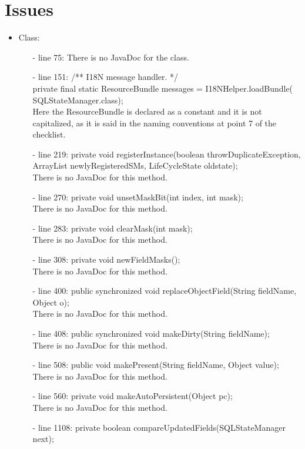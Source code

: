 \documentclass[18pt,oneside,a4paper, titlepage]{article}
\begin{document}
\newpage
\section{Issues}
	\begin{itemize}
		\item Class:
			\begin{itemize}
				\item[-] line 75: There is no JavaDoc for the class.
				\item[-] line 151: /** I18N message handler. */\\
				private final static ResourceBundle messages = I18NHelper.loadBundle(
				SQLStateManager.class);\\
				Here the ResourceBundle is declared as a constant and it is not capitalized, as it is said in the naming conventions at point 7 of the checklist.
				\item[-] line 219: private void registerInstance(boolean throwDuplicateException,
				ArrayList newlyRegisteredSMs, LifeCycleState oldstate);\\
				There is no JavaDoc for this method.
				\item[-] line 270: private void unsetMaskBit(int index, int mask);\\
				There is no JavaDoc for this method.
				\item[-] line 283: private void clearMask(int mask);\\
				There is no JavaDoc for this method.
				\item[-] line 308: private void newFieldMasks();\\
				There is no JavaDoc for this method.
				\item[-] line 400: public synchronized void replaceObjectField(String fieldName, Object o);\\
				There is no JavaDoc for this method.
				\item[-] line 408: public synchronized void makeDirty(String fieldName);
				\\There is no JavaDoc for this method.
				\item[-] line 508: public void makePresent(String fieldName, Object value);
				\\There is no JavaDoc for this method.
				\item[-] line 560: private void makeAutoPersistent(Object pc);
				\\There is no JavaDoc for this method.
				\item[-] line 1108: private boolean compareUpdatedFields(SQLStateManager next);

\end{itemize}
\end{itemize}
\end{document}
